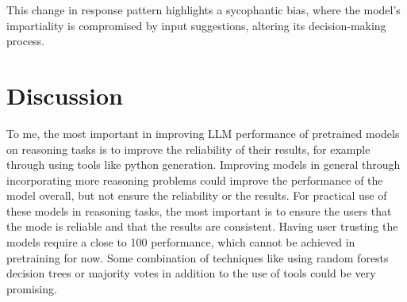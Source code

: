 \documentclass{article}
\begin{document}
    This change in response pattern highlights a sycophantic bias, where the model's impartiality is compromised by input suggestions, altering its decision-making process.


    \section{Discussion}\label{sec:discussion}

    To me, the most important in improving LLM performance of pretrained models on reasoning tasks is to improve the reliability of their results, for example through using tools like python generation.
    Improving models in general through incorporating more reasoning problems could improve the performance of the model overall, but not ensure the reliability or the results.
    For practical use of these models in reasoning tasks, the most important is to ensure the users that the mode is reliable and that the results are consistent.
    Having user trusting the models require a close to 100 performance, which cannot be achieved in pretraining for now.
    Some combination of techniques like using random forests decision trees or majority votes in addition to the use of tools could be very promising.

    
    
\end{document}
